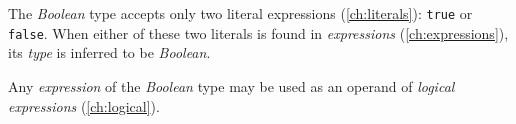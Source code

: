 The \emph{Boolean} type accepts only two literal expressions (\ref{ch:literals}): \verb|true| or \verb|false|.
When either of these two literals is found in \emph{expressions} (\ref{ch:expressions}),
its \emph{type} is inferred to be \emph{Boolean}.

Any \emph{expression} of the \emph{Boolean} type
may be used as an operand of \emph{logical expressions} (\ref{ch:logical}).
